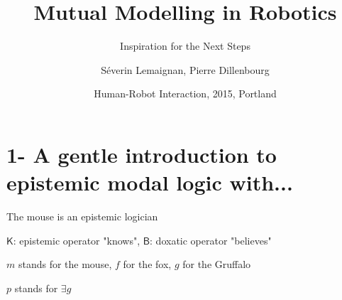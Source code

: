 \documentclass[compress]{beamer}
\title{Mutual Modelling in Robotics}
\subtitle{Inspiration for the Next Steps}
\date{Human-Robot Interaction, 2015, Portland}
\author{\scriptsize {\Medium Séverin Lemaignan}, Pierre Dillenbourg}
\institute{Computer-Human Interaction\\for Learning and Instruction {\Medium
EPFL}}
\begin{document}

\maketitle


\section{1- A gentle introduction to epistemic modal logic with...}

\begin{frame}{The mouse is an epistemic logician}

$\mathsf{K}$: epistemic operator "{\Medium knows}", $\mathsf{B}$: doxatic operator
"{\Medium believes}"

$m$ stands for the mouse, $f$ for the fox, $g$ for the Gruffalo

$p$ stands for $\exists g$

\Large


\end{frame}
\end{document}
